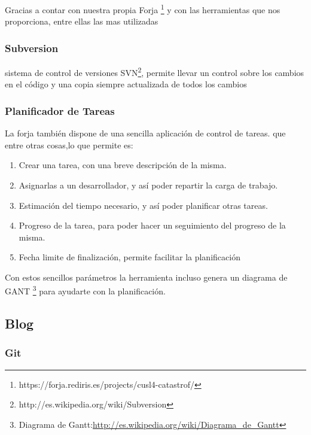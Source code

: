 Gracias a contar con nuestra propia Forja
\footnote{https://forja.rediris.es/projects/cusl4-catastrof/} y con las
herramientas que nos proporciona, entre ellas las mas utilizadas 
\subsubsection*{Subversion}
sistema de control de versiones
SVN\footnote{http://es.wikipedia.org/wiki/Subversion}, permite llevar un
control sobre los cambios en el código y una copia siempre actualizada de
todos los cambios
\subsubsection*{Planificador de Tareas}
La forja también dispone de una sencilla aplicación de control de tareas.
que entre otras cosas,lo que permite es:
\begin{enumerate}
 \item Crear una tarea, con una breve descripción de la misma.
 \item Asignarlas a un desarrollador, y así poder repartir la carga de trabajo.
 \item Estimación del tiempo necesario, y así poder planificar otras tareas.
 \item Progreso de la tarea, para poder hacer un seguimiento del progreso de la
misma.
 \item Fecha limite de finalización, permite facilitar la planificación
\end{enumerate}
Con estos sencillos parámetros la herramienta incluso genera un diagrama de
GANT
\footnote{Diagrama de
Gantt:\url{http://es.wikipedia.org/wiki/Diagrama_de_Gantt}} para ayudarte con
la planificación.

\subsection*{Blog}

\subsubsection*{Git}


